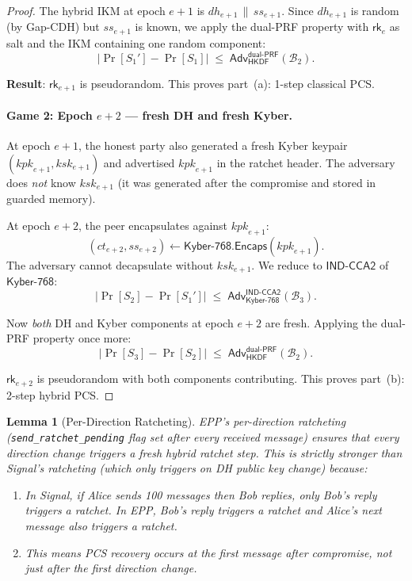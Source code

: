 \documentclass[11pt,a4paper]{article}
\newtheorem{lemma}[theorem]{Lemma}
\theoremstyle{definition}
\theoremstyle{remark}
\newcommand{\adv}{\mathsf{Adv}}
\newcommand{\advB}{\mathcal{B}}
\newcommand{\HKDF}{\mathsf{HKDF}}
\newcommand{\KEM}{\mathsf{Kyber\text{-}768}}
\newcommand{\Encaps}{\mathsf{Encaps}}
\newcommand{\INDCCA}{\mathsf{IND\text{-}CCA2}}
\newcommand{\dualPRF}{\mathsf{dual\text{-}PRF}}
\newcommand{\rk}{\mathsf{rk}}
\newcommand{\concat}{\,\|\,}
\begin{document}
\begin{proof}
The hybrid IKM at epoch $e{+}1$ is $\mathit{dh}_{e+1} \concat \mathit{ss}_{e+1}$.
Since $\mathit{dh}_{e+1}$ is random (by Gap-CDH) but $\mathit{ss}_{e+1}$ is
known, we apply the dual-PRF property with $\rk_e$ as salt and the
IKM containing one random component:
\[
  |\Pr[S_1'] - \Pr[S_1]| \;\leq\; \adv^{\dualPRF}_{\HKDF}(\advB_2).
\]

\textbf{Result}: $\rk_{e+1}$ is pseudorandom.  This proves part~(a): 1-step
classical PCS.

\paragraph{Game 2: Epoch $e{+}2$ --- fresh DH and fresh Kyber.}
At epoch $e{+}1$, the honest party also generated a fresh Kyber keypair
$(\mathit{kpk}_{e+1}, \mathit{ksk}_{e+1})$ and advertised $\mathit{kpk}_{e+1}$
in the ratchet header.  The adversary does \emph{not} know $\mathit{ksk}_{e+1}$
(it was generated after the compromise and stored in guarded memory).

At epoch $e{+}2$, the peer encapsulates against $\mathit{kpk}_{e+1}$:
\[
  (\mathit{ct}_{e+2}, \mathit{ss}_{e+2}) \gets \KEM.\Encaps(\mathit{kpk}_{e+1}).
\]
The adversary cannot decapsulate without $\mathit{ksk}_{e+1}$.  We reduce to
$\INDCCA$ of $\KEM$:
\[
  |\Pr[S_2] - \Pr[S_1']| \;\leq\; \adv^{\INDCCA}_{\KEM}(\advB_3).
\]

Now \emph{both} DH and Kyber components at epoch $e{+}2$ are fresh.  Applying
the dual-PRF property once more:
\[
  |\Pr[S_3] - \Pr[S_2]| \;\leq\; \adv^{\dualPRF}_{\HKDF}(\advB_2).
\]

$\rk_{e+2}$ is pseudorandom with both components contributing.  This proves
part~(b): 2-step hybrid PCS. \qedhere
\end{proof}

\begin{lemma}[Per-Direction Ratcheting]
\label{lem:per-dir}
EPP's per-direction ratcheting (\texttt{send\_ratchet\_pending} flag set after
every received message) ensures that \emph{every direction change} triggers a
fresh hybrid ratchet step.  This is strictly stronger than Signal's ratcheting
(which only triggers on DH public key change) because:
\begin{enumerate}[nosep]
  \item In Signal, if Alice sends 100 messages then Bob replies, only Bob's
        reply triggers a ratchet.  In EPP, Bob's reply triggers a ratchet
        \emph{and} Alice's next message also triggers a ratchet.
  \item This means PCS recovery occurs at the \emph{first} message after
        compromise, not just after the first direction change.
\end{enumerate}
\end{lemma}
\end{document}
